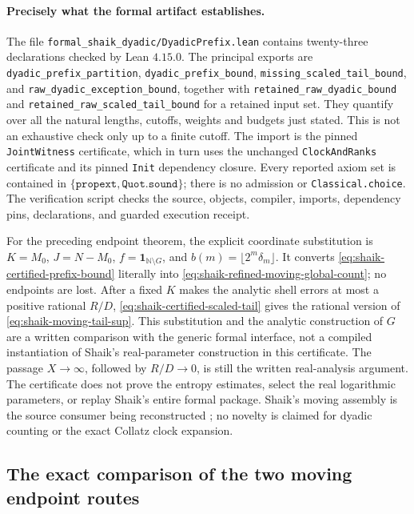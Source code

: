 \documentclass[11pt]{article}
\theoremstyle{remark}\newtheorem{remark}[proposition]{Remark}
\newcommand{\NN}{\mathbb N}
\begin{document}
\paragraph{Precisely what the formal artifact establishes.}
The file \texttt{formal\_shaik\_dyadic/DyadicPrefix.lean} contains
twenty-three declarations checked by Lean \(4.15.0\).
The principal exports are
\texttt{dyadic\_prefix\_partition},
\texttt{dyadic\_prefix\_bound},
\texttt{missing\_scaled\_tail\_bound}, and
\texttt{raw\_dyadic\_exception\_bound}, together with
\texttt{retained\_raw\_dyadic\_bound} and
\texttt{retained\_raw\_scaled\_tail\_bound} for a retained input set.
They quantify over all the natural lengths, cutoffs, weights and budgets
just stated. This is not an exhaustive check only up to a finite cutoff.
The import is the pinned \texttt{JointWitness} certificate, which in turn
uses the unchanged \texttt{ClockAndRanks} certificate and its pinned
\texttt{Init} dependency closure. Every reported axiom set is contained in
\(\{\texttt{propext},\texttt{Quot.sound}\}\); there is no admission
or \texttt{Classical.choice}. The verification script checks the source,
objects, compiler, imports, dependency pins, declarations, and guarded
execution receipt.

For the preceding endpoint theorem, the explicit coordinate substitution
is \(K=M_0\), \(J=N-M_0\),
\(f=\boldsymbol1_{\NN\setminus G}\), and
\(b(m)=\lfloor2^m\delta_m\rfloor\). It converts
\eqref{eq:shaik-certified-prefix-bound} literally into
\eqref{eq:shaik-refined-moving-global-count}; no endpoints are lost.
After a fixed \(K\) makes the analytic shell errors at most a positive
rational \(R/D\), \eqref{eq:shaik-certified-scaled-tail} gives the
rational version of \eqref{eq:shaik-moving-tail-sup}.
This substitution and the analytic construction of \(G\) are a written
comparison with the generic formal interface, not a compiled instantiation
of Shaik's real-parameter construction in this certificate.
The passage \(X\to\infty\), followed by \(R/D\to0\), is still the written
real-analysis argument. The certificate does not prove the entropy
estimates, select the real logarithmic parameters, or replay Shaik's
entire formal package. Shaik's moving assembly is the source consumer
being reconstructed \cite{Shaik2026v324}; no novelty is claimed for
dyadic counting or the exact Collatz clock expansion.

\subsection{The exact comparison of the two moving endpoint routes}
\end{document}
